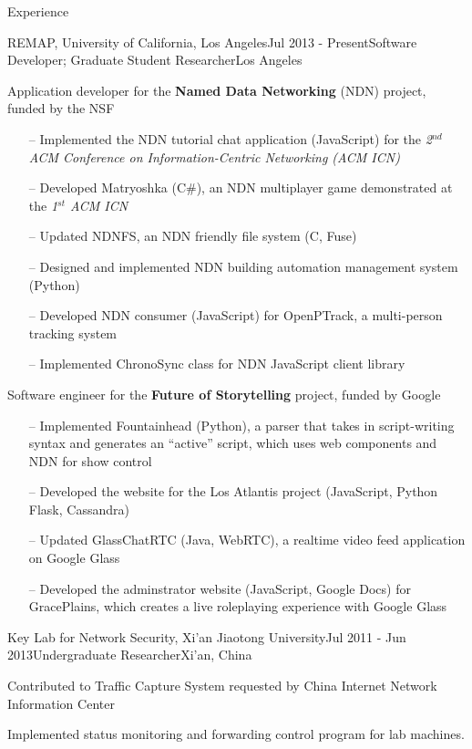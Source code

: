 \documentclass{resume} %
\begin{document}
\begin{rSection}{Experience}

\begin{rSubsection}{REMAP, University of California, Los Angeles}{Jul 2013 - Present}{Software Developer; Graduate Student Researcher}{Los Angeles}
\item Application developer for the \textbf{Named Data Networking} (NDN) project, funded by the NSF

\begin{itemize}[noitemsep,topsep=-6pt]
\item[--] Implemented the NDN tutorial chat application (JavaScript) for the \textit{2$^{nd}$ ACM Conference on Information-Centric Networking (ACM ICN)}
\item[--] Developed Matryoshka (C\#), an NDN multiplayer game demonstrated at the \textit{1$^{st}$ ACM ICN}
\item[--] Updated NDNFS, an NDN friendly file system (C, Fuse)
\item[--] Designed and implemented NDN building automation management system (Python)
\item[--] Developed NDN consumer (JavaScript) for OpenPTrack, a multi-person tracking system
\item[--] Implemented ChronoSync class for NDN JavaScript client library
\end{itemize}

\item Software engineer for the \textbf{Future of Storytelling} project, funded by Google

\begin{itemize}[noitemsep,topsep=-6pt]
\item[--] Implemented Fountainhead (Python), a parser that takes in script-writing syntax and generates an ``active'' script, which uses web components and NDN for show control
\item[--] Developed the website for the Los Atlantis project (JavaScript, Python Flask, Cassandra)
\item[--] Updated GlassChatRTC (Java, WebRTC), a realtime video feed application on Google Glass
\item[--] Developed the adminstrator website (JavaScript, Google Docs) for GracePlains, which creates a live roleplaying experience with Google Glass
\end{itemize}

\end{rSubsection}

\begin{rSubsection}{Key Lab for Network Security, Xi’an Jiaotong University}{Jul 2011 - Jun 2013}{Undergraduate Researcher}{Xi’an, China}
\item Contributed to Traffic Capture System requested by China Internet Network Information Center
\item Implemented status monitoring and forwarding control program for lab machines.
\end{rSubsection}

\end{rSection}
\end{document}
